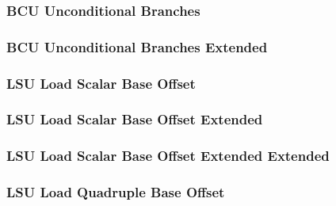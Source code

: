 

\subsubsection[{\small BCU Unconditional Branches}]{BCU Unconditional Branches} \label{sec:format-BCU-UB}



\subsubsection[{\small BCU Unconditional Branches Extended}]{BCU Unconditional Branches Extended} \label{sec:format-BCU-UB.X}



\subsubsection[{\small LSU Load Scalar Base Offset}]{LSU Load Scalar Base Offset} \label{sec:format-LSU-LSBO}



\subsubsection[{\small LSU Load Scalar Base Offset Extended}]{LSU Load Scalar Base Offset Extended} \label{sec:format-LSU-LSBO.X}



\subsubsection[{\small LSU Load Scalar Base Offset Extended Extended}]{LSU Load Scalar Base Offset Extended Extended} \label{sec:format-LSU-LSBO.Y}



\subsubsection[{\small LSU Load Quadruple Base Offset}]{LSU Load Quadruple Base Offset} \label{sec:format-LSU-LQBO}

